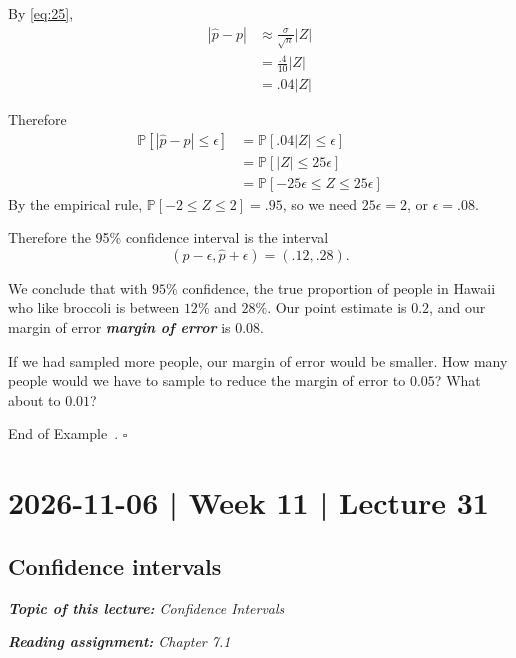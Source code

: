 \documentclass[10pt]{article}
\theoremstyle{definition}
\newtheorem{example}[theorem]{Example}
\renewenvironment{example}
{\begin{oldexample}}
  {\par\smallskip\hfill   End of Example~\theexample. $\square$    \par\end{oldexample}}
\newcommand{\1}[1]{\textbf{1}_{\left[#1\right]}} %
\def\P{\mathbb{P}} %
\DeclareRobustCommand{\demph}[1]{%
  \ifmmode
  {\color{Blue}#1}%
  \else
  {\color{Blue}\bfseries\slshape #1}%
  \fi
}
\begin{document}
\begin{example}[Broccoli Poll]
  By \cref{eq:25},
  \begin{align*}
    \left| \widehat{p}-p \right| 
    &\approx \frac{\sigma}{\sqrt{n}}|Z|\\
    &= \frac{.4}{10} |Z|\\
    &= .04 |Z|
  \end{align*}

  Therefore
  \begin{align*} 
    \P\left[|\widehat{p}-p| \leq \epsilon\right] 
    &= \P\left[.04|Z| \leq\epsilon \right] \\
    &= \P\left[|Z| \leq 25\epsilon\right]\\
    &= \P\left[-25\epsilon \leq Z \leq 25 \epsilon\right]
  \end{align*}
  By the empirical rule, $\P\left[-2 \leq Z \leq 2\right]=.95$, so we need
  $25\epsilon=2$, or $\epsilon= .08$.

  Therefore the 95\% confidence interval is the interval
  \begin{equation*}
    (\widehat{p}-\epsilon, \widehat{p}+\epsilon) = (.12,.28).
  \end{equation*}

  We conclude that with $95\%$ confidence, the true proportion of people in
  Hawaii who like broccoli is between $12\%$ and $28\%$. Our point estimate is
  $0.2$, and our \demph{margin of error} is $0.08$.

  If we had sampled more people, our margin of error would be smaller. How many
  people would we have to sample to reduce the margin of error to $0.05$? What
  about to $0.01$?
\end{example}

\newpage
\section{2026-11-06 | Week 11 | Lecture 31}

\subsection{Confidence intervals}
\begin{center}
  \begin{tcolorbox}[width=0.9\textwidth, colback=white, colframe=black]
    \textit{\textbf{Topic of this lecture:} Confidence Intervals}

    \textit{\textbf{Reading assignment:} Chapter 7.1}
  \end{tcolorbox}
\end{center}
\end{document}
